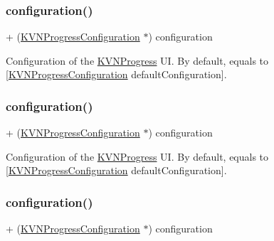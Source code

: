 \subsubsection{\texorpdfstring{configuration()}{configuration()}\hspace{0.1cm}{\footnotesize\ttfamily [1/3]}}
{\footnotesize\ttfamily + (\mbox{\hyperlink{interface_k_v_n_progress_configuration}{K\+V\+N\+Progress\+Configuration}} $\ast$) configuration \begin{DoxyParamCaption}{ }\end{DoxyParamCaption}}

Configuration of the {\ttfamily \mbox{\hyperlink{interface_k_v_n_progress}{K\+V\+N\+Progress}}} UI. By default, equals to {\ttfamily \mbox{[}\mbox{\hyperlink{interface_k_v_n_progress_configuration}{K\+V\+N\+Progress\+Configuration}} default\+Configuration\mbox{]}}. \mbox{\label{interface_k_v_n_progress_aaba9484a867f6da9cb051da337161d15}} 
\subsubsection{\texorpdfstring{configuration()}{configuration()}\hspace{0.1cm}{\footnotesize\ttfamily [2/3]}}
{\footnotesize\ttfamily + (\mbox{\hyperlink{interface_k_v_n_progress_configuration}{K\+V\+N\+Progress\+Configuration}} $\ast$) configuration \begin{DoxyParamCaption}{ }\end{DoxyParamCaption}}

Configuration of the {\ttfamily \mbox{\hyperlink{interface_k_v_n_progress}{K\+V\+N\+Progress}}} UI. By default, equals to {\ttfamily \mbox{[}\mbox{\hyperlink{interface_k_v_n_progress_configuration}{K\+V\+N\+Progress\+Configuration}} default\+Configuration\mbox{]}}. \mbox{\label{interface_k_v_n_progress_aaba9484a867f6da9cb051da337161d15}} 
\subsubsection{\texorpdfstring{configuration()}{configuration()}\hspace{0.1cm}{\footnotesize\ttfamily [3/3]}}
{\footnotesize\ttfamily + (\mbox{\hyperlink{interface_k_v_n_progress_configuration}{K\+V\+N\+Progress\+Configuration}} $\ast$) configuration \begin{DoxyParamCaption}{ }\end{DoxyParamCaption}}

